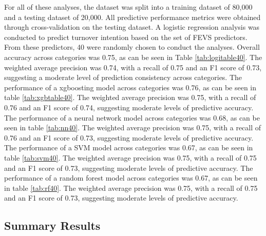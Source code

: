 \documentclass[
  man]{apa7}
\begin{document}
For all of these analyses, the dataset was split into a training dataset of 80,000 and a testing dataset of 20,000. All predictive performance metrics were obtained through cross-validation on the testing dataset. A logistic regression analysis was conducted to predict turnover intention based on the set of FEVS predictors. From these predictors, 40 were randomly chosen to conduct the analyses. Overall accuracy across categories was 0.75, as can be seen in Table \ref{tab:logitable40}. The weighted average precision was 0.74, with a recall of 0.75 and an F1 score of 0.73, suggesting a moderate level of prediction consistency across categories.
The performance of a xgboosting model across categories was 0.76, as can be seen in table \ref{tab:xgbtable40}. The weighted average precision was 0.75, with a recall of 0.76 and an F1 score of 0.74, suggesting moderate levels of predictive accuracy.
The performance of a neural network model across categories was 0.68, as can be seen in table \ref{tab:nn40}. The weighted average precision was 0.75, with a recall of 0.76 and an F1 score of 0.73, suggesting moderate levels of predictive accuracy.
The performance of a SVM model across categories was 0.67, as can be seen in table \ref{tab:svm40}. The weighted average precision was 0.75, with a recall of 0.75 and an F1 score of 0.73, suggesting moderate levels of predictive accuracy.
The performance of a random forest model across categories was 0.67, as can be seen in table \ref{tab:rf40}. The weighted average precision was 0.75, with a recall of 0.75 and an F1 score of 0.73, suggesting moderate levels of predictive accuracy.

\subsection{Summary Results}\label{summary-results}
\end{document}
